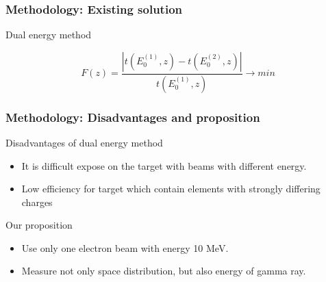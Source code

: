 \documentclass[11pt]{beamer}
\begin{document}
\begin{frame}
\begin{columns}
\begin{column}{0.4\textwidth}
        \end{column}
    \end{columns}  
\end{frame}

\begin{frame}
    \frametitle{Methodology: Existing solution}
    \begin{block}{Dual energy method}%
        
        $$
        F(z) = \frac{|t(E^{(1)}_0,z) - t(E^{(2)}_0,z)|}{t(E^{(1)}_0,z)} \to min
        $$
    \end{block}

\end{frame}

\begin{frame}
    \frametitle{Methodology: Disadvantages and proposition}
    \begin{block}{Disadvantages of dual energy method}%
        \begin{itemize}
            \item It is difficult expose on the target with beams with different energy.
            \item Low efficiency for target which contain elements with strongly differing charges
        \end{itemize}
    \end{block}
    \begin{block}{Our proposition}%
        \begin{itemize}
            \item Use only one electron beam with energy 10 MeV.
            \item Measure not only space distribution, but also energy of gamma ray.
        \end{itemize}
    \end{block}
\end{frame}
\end{document}
